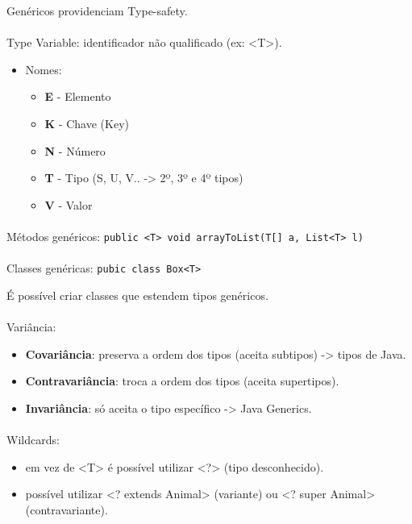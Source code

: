 \documentclass[../resumosLPOO.tex]{subfiles}
\begin{document}
 

Genéricos providenciam Type-safety.

\paragraph{}

Type Variable: identificador não qualificado (ex: <T>).
\begin{itemize}
    \item Nomes:
    \begin{itemize}
        \item \textbf{E} - Elemento
        \item \textbf{K} - Chave (Key)
        \item \textbf{N} - Número
        \item \textbf{T} - Tipo (S, U, V.. -> 2º, 3º e 4º tipos)
        \item \textbf{V} - Valor
    \end{itemize}
\end{itemize}

\paragraph{}

Métodos genéricos: \lstinline{public <T> void arrayToList(T[] a, List<T> l)}

\paragraph{}

Classes genéricas: \lstinline{pubic class Box<T>}

É possível criar classes que estendem tipos genéricos.

\paragraph{}

Variância:
\begin{itemize}
    \item \textbf{Covariância}: preserva a ordem dos tipos (aceita subtipos) -> tipos de Java.
    \item \textbf{Contravariância}: troca a ordem dos tipos (aceita supertipos).
    \item \textbf{Invariância}: só aceita o tipo específico -> Java Generics.
\end{itemize}

\paragraph{}

Wildcards: 
\begin{itemize}
    \item em vez de <T> é possível utilizar <?> (tipo desconhecido).
    \item possível utilizar <? extends Animal> (variante) ou <? super Animal> (contravariante).
\end{itemize}
\end{document}
